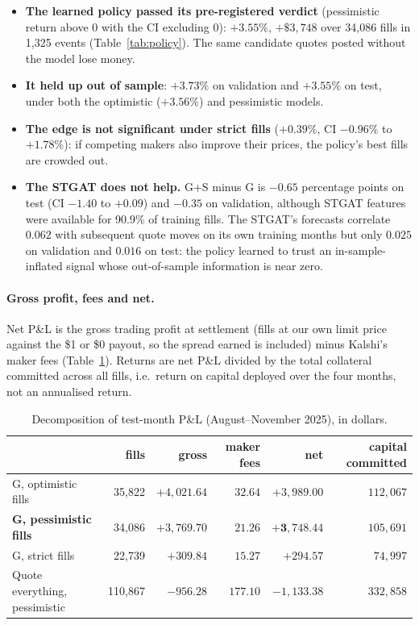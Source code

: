 \documentclass[11pt,a4paper]{article}
\begin{document}
\begin{itemize}
  \item \textbf{The learned policy passed its pre-registered verdict} (pessimistic return above 0 with the CI
    excluding 0): $+3.55\%$, $+\$3{,}748$ over 34{,}086 fills in 1{,}325 events (Table~\ref{tab:policy}). The same
    candidate quotes posted without the model lose money.
  \item \textbf{It held up out of sample}: $+3.73\%$ on validation and $+3.55\%$ on test, under both the optimistic
    ($+3.56\%$) and pessimistic models.
  \item \textbf{The edge is not significant under strict fills} ($+0.39\%$, CI $-0.96\%$ to $+1.78\%$): if competing
    makers also improve their prices, the policy's best fills are crowded out.
  \item \textbf{The STGAT does not help.} G+S minus G is $-0.65$ percentage points on test (CI $-1.40$ to $+0.09$)
    and $-0.35$ on validation, although STGAT features were available for 90.9\% of training fills. The STGAT's
    forecasts correlate $0.062$ with subsequent quote moves on its own training months but only $0.025$ on
    validation and $0.016$ on test: the policy learned to trust an in-sample-inflated signal whose out-of-sample
    information is near zero.
\end{itemize}

\paragraph{Gross profit, fees and net.} Net P\&L is the gross trading profit at settlement (fills at our own limit
price against the \$1 or \$0 payout, so the spread earned is included) minus Kalshi's maker fees
(Table~\ref{tab:fees}). Returns are net P\&L divided by the total collateral committed across all fills, i.e.\ return on
capital deployed over the four months, not an annualised return.

\begin{table}[htbp]
\centering
\caption{Decomposition of test-month P\&L (August--November 2025), in dollars.}
\label{tab:fees}
\small
\begin{tabular}{lrrrrr}
\toprule
 & fills & gross & maker fees & \textbf{net} & capital committed \\
\midrule
G, optimistic fills & 35{,}822 & $+4{,}021.64$ & $32.64$ & $+3{,}989.00$ & $112{,}067$ \\
\textbf{G, pessimistic fills} & 34{,}086 & $+3{,}769.70$ & $21.26$ & $\bm{+3{,}748.44}$ & $105{,}691$ \\
G, strict fills & 22{,}739 & $+309.84$ & $15.27$ & $+294.57$ & $74{,}997$ \\
\midrule
Quote everything, pessimistic & 110{,}867 & $-956.28$ & $177.10$ & $-1{,}133.38$ & $332{,}858$ \\
\bottomrule
\end{tabular}
\end{table}
\end{document}
